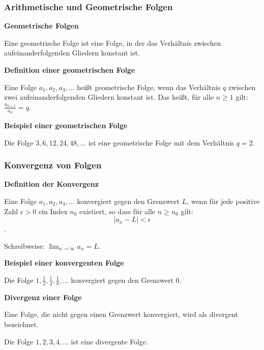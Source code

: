 \documentclass{beamer}
\begin{document}
\begin{frame}
  \frametitle{Arithmetische und Geometrische Folgen}
  
    \textbf{Geometrische Folgen}
  
    Eine geometrische Folge ist eine Folge, in der das Verhältnis zwischen aufeinanderfolgenden Gliedern konstant ist.
  
    \vspace{0.5em}
  
    \textbf{Definition einer geometrischen Folge}
  
    Eine Folge $a_1, a_2, a_3, \ldots$ heißt geometrische Folge, wenn das Verhältnis $q$ zwischen zwei aufeinanderfolgenden Gliedern konstant ist. Das heißt, für alle $n \geq 1$ gilt: $\frac{a_{n+1}}{a_n} = q$.
  
    \vspace{0.5em}
  
    \textbf{Beispiel einer geometrischen Folge}
  
    Die Folge $3, 6, 12, 24, 48, \ldots$ ist eine geometrische Folge mit dem Verhältnis $q = 2$.
  
  \end{frame}
  
  \begin{frame}
    \frametitle{Konvergenz von Folgen}
  
    \textbf{Definition der Konvergenz}
  
    Eine Folge $a_1, a_2, a_3, \ldots$ konvergiert gegen den Grenzwert $L$, wenn für jede positive Zahl $\epsilon > 0$ ein Index $n_0$ existiert, so dass für alle $n \geq n_0$ gilt: $$|a_n - L| < \epsilon$$.
    
    Schreibweise: $\lim_{n \to \infty} a_n = L$.
  
    \vspace{0.5em}
  
    \textbf{Beispiel einer konvergenten Folge}
  
    Die Folge $1, \frac{1}{2}, \frac{1}{4}, \frac{1}{8}, \ldots$ konvergiert gegen den Grenzwert $0$.
  
    \vspace{1em}
  
    \textbf{Divergenz einer Folge}
  
    Eine Folge, die nicht gegen einen Grenzwert konvergiert, wird als divergent bezeichnet.
    
    Die Folge $1, 2, 3, 4, \ldots$ ist eine divergente Folge.
  
  \end{frame}
  
\end{document}
